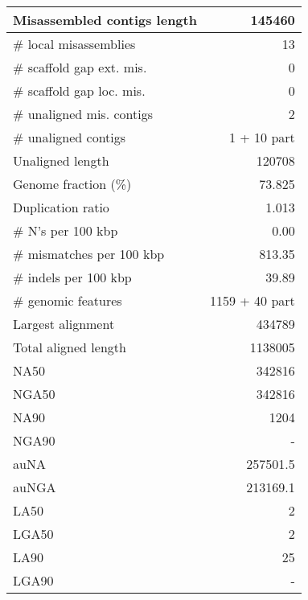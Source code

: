 \documentclass[12pt,a4paper]{article}
\begin{document}
\begin{table}[ht]
\begin{center}
\begin{tabular}{|l*{1}{|r}|}
Misassembled contigs length & 145460 \\ \hline
\# local misassemblies & 13 \\ \hline
\# scaffold gap ext. mis. & 0 \\ \hline
\# scaffold gap loc. mis. & 0 \\ \hline
\# unaligned mis. contigs & 2 \\ \hline
\# unaligned contigs & 1 + 10 part \\ \hline
Unaligned length & 120708 \\ \hline
Genome fraction (\%) & 73.825 \\ \hline
Duplication ratio & 1.013 \\ \hline
\# N's per 100 kbp & 0.00 \\ \hline
\# mismatches per 100 kbp & 813.35 \\ \hline
\# indels per 100 kbp & 39.89 \\ \hline
\# genomic features & 1159 + 40 part \\ \hline
Largest alignment & 434789 \\ \hline
Total aligned length & 1138005 \\ \hline
NA50 & 342816 \\ \hline
NGA50 & 342816 \\ \hline
NA90 & 1204 \\ \hline
NGA90 & - \\ \hline
auNA & 257501.5 \\ \hline
auNGA & 213169.1 \\ \hline
LA50 & 2 \\ \hline
LGA50 & 2 \\ \hline
LA90 & 25 \\ \hline
LGA90 & - \\ \hline
\end{tabular}
\end{center}
\end{table}
\end{document}
